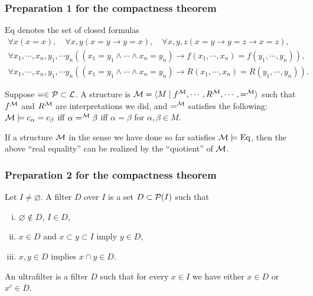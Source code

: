 \documentclass{../../../small}
\begin{document}
\subsubsection*{Preparation 1 for the compactness theorem}

\begin{defn*}
$\mathrm{Eq}$ denotes the set of closed formulas
\begin{gather*}
\forall x(x=x),\quad\forall x,y(x=y\to y=x),\quad\forall x,y,z(x=y\to y=z\to x=z),\\
\forall x_1,\cdots,x_n,y_1,\cdots y_n((x_1=y_1\wedge\cdots\wedge x_n=y_n)\to f(x_1,\cdots,x_n)=f(y_1,\cdots,y_n)),\\
\forall x_1,\cdots,x_n,y_1,\cdots y_n((x_1=y_1\wedge\cdots\wedge x_n=y_n)\to R(x_1,\cdots,x_n)=R(y_1,\cdots,y_n)).
\end{gather*}
\end{defn*}


\begin{defn*}
Suppose $=\in\mathcal{P}\subset\mathcal{L}$.
A structure is $\mathcal{M}=\langle M\mid f^{\mathcal{M}},\cdots,R^{\mathcal{M}},\cdots,=^{\mathcal{M}}\rangle$ such that $f^{\mathcal{M}}$ and $R^{\mathcal{M}}$ are interpretations we did, and $=^{\mathcal{M}}$ satisfies the following:
$\mathcal{M}\models c_\alpha=c_\beta$ iff $\alpha=^{\mathcal{M}}\beta$ iff $\alpha=\beta$ for $\alpha,\beta\in M$.
\end{defn*}

If a structure $\mathcal{M}$ in the sense we have done so far satisfies $\mathcal{M}\models\mathrm{Eq}$, then the above ``real equality'' can be realized by the ``quotient'' of $\mathcal{M}$.

\subsubsection*{Preparation 2 for the compactness theorem}

\begin{defn*}
Let $I\ne\varnothing$.
A filter $D$ over $I$ is a set $D\subset\mathcal{P}(I)$ such that
\begin{enumerate}[(i)]
\item $\varnothing\notin D$, $I\in D$,
\item $x\in D$ and $x\subset y\subset I$ imply $y\in D$,
\item $x,y\in D$ implies $x\cap y\in D$.
\end{enumerate}
An ultrafilter is a filter $D$ such that for every $x\in I$ we have either $x\in D$ or $x^c\in D$.
\end{defn*}
\end{document}
